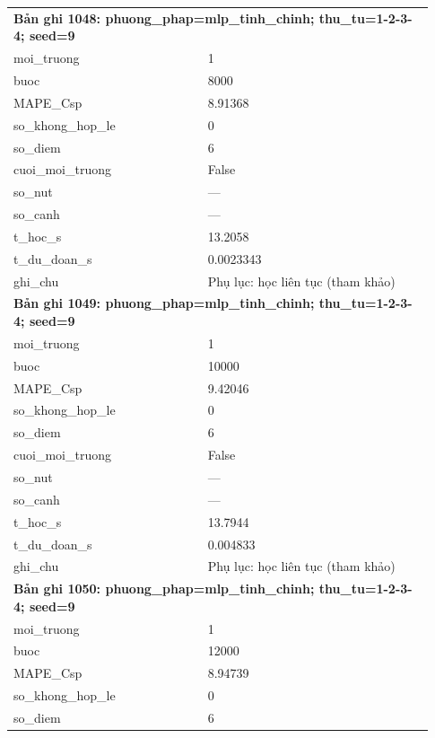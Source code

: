 \begin{longtable}{p{0.43\linewidth}p{0.50\linewidth}}
\midrule
\multicolumn{2}{p{0.95\linewidth}}{\textbf{Bản ghi 1048: phuong\_phap=mlp\_tinh\_chinh; thu\_tu=1-2-3-4; seed=9}} \\
moi\_\allowbreak truong & 1 \\
buoc & 8000 \\
MAPE\_\allowbreak Csp & 8.91368 \\
so\_\allowbreak khong\_\allowbreak hop\_\allowbreak le & 0 \\
so\_\allowbreak diem & 6 \\
cuoi\_\allowbreak moi\_\allowbreak truong & False \\
so\_\allowbreak nut & — \\
so\_\allowbreak canh & — \\
t\_\allowbreak hoc\_\allowbreak s & 13.2058 \\
t\_\allowbreak du\_\allowbreak doan\_\allowbreak s & 0.0023343 \\
ghi\_\allowbreak chu & Phụ lục: học liên tục (tham khảo) \\
\midrule
\multicolumn{2}{p{0.95\linewidth}}{\textbf{Bản ghi 1049: phuong\_phap=mlp\_tinh\_chinh; thu\_tu=1-2-3-4; seed=9}} \\
moi\_\allowbreak truong & 1 \\
buoc & 10000 \\
MAPE\_\allowbreak Csp & 9.42046 \\
so\_\allowbreak khong\_\allowbreak hop\_\allowbreak le & 0 \\
so\_\allowbreak diem & 6 \\
cuoi\_\allowbreak moi\_\allowbreak truong & False \\
so\_\allowbreak nut & — \\
so\_\allowbreak canh & — \\
t\_\allowbreak hoc\_\allowbreak s & 13.7944 \\
t\_\allowbreak du\_\allowbreak doan\_\allowbreak s & 0.004833 \\
ghi\_\allowbreak chu & Phụ lục: học liên tục (tham khảo) \\
\midrule
\multicolumn{2}{p{0.95\linewidth}}{\textbf{Bản ghi 1050: phuong\_phap=mlp\_tinh\_chinh; thu\_tu=1-2-3-4; seed=9}} \\
moi\_\allowbreak truong & 1 \\
buoc & 12000 \\
MAPE\_\allowbreak Csp & 8.94739 \\
so\_\allowbreak khong\_\allowbreak hop\_\allowbreak le & 0 \\
so\_\allowbreak diem & 6 \\

\end{longtable}
